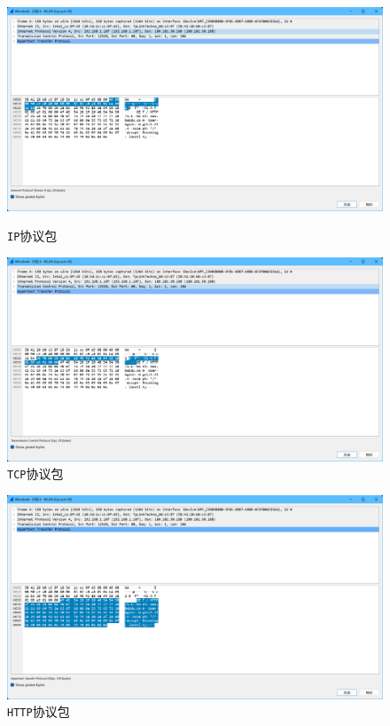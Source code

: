 \documentclass{article}
\begin{document}
\begin{figure}[H]
  \centering
  \begin{minipage}[b]{0.45\textwidth}
    \includegraphics[width=\textwidth]{images/07.png}
    \caption{\texttt{IP}协议包}
  \end{minipage}
  \hfill
  \begin{minipage}[b]{0.45\textwidth}
    \includegraphics[width=\textwidth]{images/08.png}
    \caption{\texttt{TCP}协议包}
  \end{minipage}
\end{figure}

\begin{figure}[H]
  \centering
  \begin{minipage}[b]{0.45\textwidth}
    \includegraphics[width=\textwidth]{images/09.png}
    \caption{\texttt{HTTP}协议包}
  \end{minipage}
\end{figure}
\end{document}
